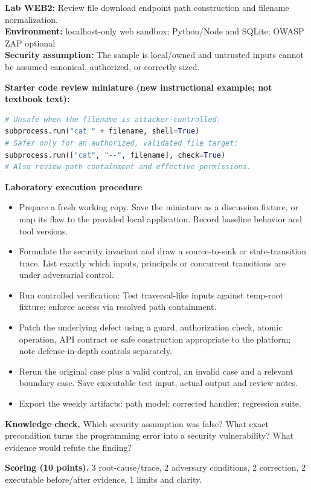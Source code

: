 \documentclass[10pt,letterpaper]{article}
\begin{document}
\begin{insight}\textbf{Lab WEB2:} Review file download endpoint path construction and filename normalization.\\\textbf{Environment:} localhost-only web sandbox; Python/Node and SQLite; OWASP ZAP optional\\\textbf{Security assumption:} The sample is local/owned and untrusted inputs cannot be assumed canonical, authorized, or correctly sized.\end{insight}
\textbf{Starter code review miniature (new instructional example; not textbook text):}
\begin{lstlisting}[language=Python]
# Unsafe when the filename is attacker-controlled:
subprocess.run("cat " + filename, shell=True)
# Safer only for an authorized, validated file target:
subprocess.run(["cat", "--", filename], check=True)
# Also review path containment and effective permissions.
\end{lstlisting}
\textbf{Laboratory execution procedure}
\begin{itemize}[leftmargin=*,itemsep=2pt]
\item Prepare a fresh working copy. Save the miniature as a discussion fixture, or map its flaw to the provided local application. Record baseline behavior and tool versions.
\item Formulate the security invariant and draw a source-to-sink or state-transition trace. List exactly which inputs, principals or concurrent transitions are under adversarial control.
\item Run controlled verification: Test traversal-like inputs against temp-root fixture; enforce access via resolved path containment.
\item Patch the underlying defect using a guard, authorization check, atomic operation, API contract or safe construction appropriate to the platform; note defense-in-depth controls separately.
\item Rerun the original case plus a valid control, an invalid case and a relevant boundary case. Save executable test input, actual output and review notes.
\item Export the weekly artifacts: path model; corrected handler; regression suite.
\end{itemize}
\textbf{Knowledge check.} Which security assumption was false? What exact precondition turns the programming error into a security vulnerability? What evidence would refute the finding?

\textbf{Scoring (10 points).} 3 root-cause/trace, 2 adversary conditions, 2 correction, 2 executable before/after evidence, 1 limits and clarity.
\end{document}
